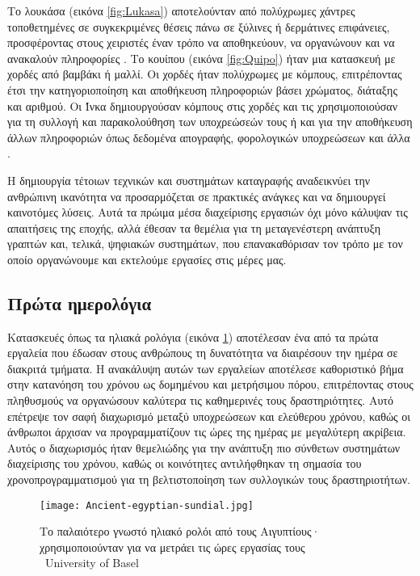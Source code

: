             Το λουκάσα (εικόνα \ref{fig:Lukasa}) αποτελούνταν από πολύχρωμες χάντρες τοποθετημένες σε συγκεκριμένες θέσεις πάνω σε ξύλινες ή δερμάτινες επιφάνειες, προσφέροντας στους χειριστές έναν τρόπο να αποθηκεύουν, να οργανώνουν και να ανακαλούν πληροφορίες \cite{Lukasa}. Το κουίπου (εικόνα \ref{fig:Quipo}) ήταν μια κατασκευή με χορδές από βαμβάκι ή μαλλί. Οι χορδές ήταν πολύχρωμες με κόμπους, επιτρέποντας έτσι την κατηγοριοποίηση και αποθήκευση πληροφοριών βάσει χρώματος, διάταξης και αριθμού. Οι Ίνκα δημιουργούσαν κόμπους στις χορδές και τις χρησιμοποιούσαν για τη συλλογή και παρακολούθηση των υποχρεώσεών τους ή και για την αποθήκευση άλλων πληροφοριών όπως δεδομένα απογραφής, φορολογικών υποχρεώσεων και άλλα \cite{Quipu}.

            Η δημιουργία τέτοιων τεχνικών και συστημάτων καταγραφής αναδεικνύει την ανθρώπινη ικανότητα να προσαρμόζεται σε πρακτικές ανάγκες και να δημιουργεί καινοτόμες λύσεις. Αυτά τα πρώιμα μέσα διαχείρισης εργασιών όχι μόνο κάλυψαν τις απαιτήσεις της εποχής, αλλά έθεσαν τα θεμέλια για τη μεταγενέστερη ανάπτυξη γραπτών και, τελικά, ψηφιακών συστημάτων, που επανακαθόρισαν τον τρόπο με τον οποίο οργανώνουμε και εκτελούμε εργασίες στις μέρες μας.

        \subsection{Πρώτα ημερολόγια}
            Κατασκευές όπως τα ηλιακά ρολόγια (εικόνα \ref{fig:Ancient-egyptian-sundial}) αποτέλεσαν ένα από τα πρώτα εργαλεία που έδωσαν στους ανθρώπους τη δυνατότητα να διαιρέσουν την ημέρα σε διακριτά τμήματα. Η ανακάλυψη αυτών των εργαλείων αποτέλεσε καθοριστικό βήμα στην κατανόηση του χρόνου ως δομημένου και μετρήσιμου πόρου, επιτρέποντας στους πληθυσμούς να οργανώσουν καλύτερα τις καθημερινές τους δραστηριότητες. Αυτό επέτρεψε τον σαφή διαχωρισμό μεταξύ υποχρεώσεων και ελεύθερου χρόνου, καθώς οι άνθρωποι άρχισαν να προγραμματίζουν τις ώρες της ημέρας με μεγαλύτερη ακρίβεια. Αυτός ο διαχωρισμός ήταν θεμελιώδης για την ανάπτυξη πιο σύνθετων συστημάτων διαχείρισης του χρόνου, καθώς οι κοινότητες αντιλήφθηκαν τη σημασία του χρονοπρογραμματισμού για τη βελτιστοποίηση των συλλογικών τους δραστηριοτήτων.

            \begin{figure}[h!] \noindent \centering
                \texttt{[image: Ancient-egyptian-sundial.jpg]}
                \caption{\centering Το παλαιότερο γνωστό ηλιακό ρολόι από τους Αιγυπτίους· \\ χρησιμοποιούνταν για να μετράει τις ώρες εργασίας τους \\ {\footnotesize \textcopyright\ University of Basel}}
                \label{fig:Ancient-egyptian-sundial}
            \end{figure}

